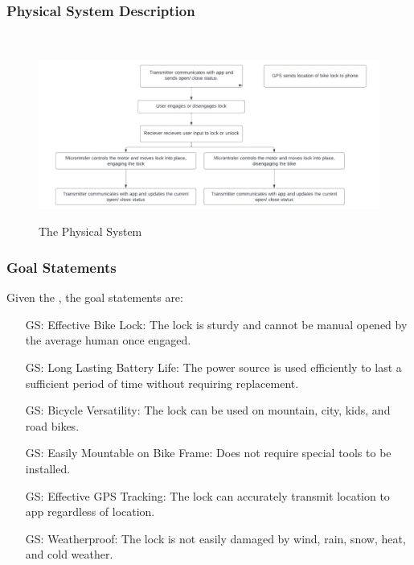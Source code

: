 \documentclass[12pt]{article}
\newcounter{goalnum} %
\begin{document}
\subsubsection{Physical System Description} \label{sec_phySystDescrip}
~\newline
 \begin{figure}[h!]
 \begin{center}
 {
 \includegraphics[width=0.6\linewidth]{../FunctionalDiagram.jpeg}
 }
 \caption{\label{The Physical System} The Physical System}
 \end{center}
 \end{figure}

\subsubsection{Goal Statements}



\noindent Given the , the goal statements are:

\begin{itemize}

\item[GS\refstepcounter{goalnum}\thegoalnum :] Effective Bike Lock: The lock is sturdy and cannot be manual opened by the average human once engaged.

\item[GS\refstepcounter{goalnum}\thegoalnum :] Long Lasting Battery Life: The power source is used efficiently to last a sufficient period of time without requiring replacement. 

\item[GS\refstepcounter{goalnum}\thegoalnum :] Bicycle Versatility: The lock can be used on mountain, city, kids, and road bikes.

\item[GS\refstepcounter{goalnum}\thegoalnum :] Easily Mountable on Bike Frame: Does not require special tools to be installed. 

\item[GS\refstepcounter{goalnum}\thegoalnum :] Effective GPS Tracking: The lock can accurately transmit location to app regardless of location.  

\item[GS\refstepcounter{goalnum}\thegoalnum :] Weatherproof: The lock is not easily damaged by wind, rain, snow, heat, and cold weather.

\end{itemize}
\end{document}
